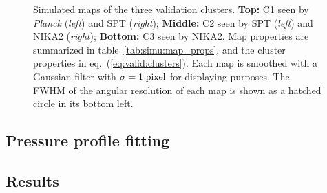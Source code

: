 \begin{figure}[t]
    \caption{%
        Simulated maps of the three validation clusters.
        \textbf{Top:} C1 seen by \textit{Planck} (\textit{left}) and SPT (\textit{right});
        \textbf{Middle:} C2 seen by SPT (\textit{left}) and NIKA2 (\textit{right});
        \textbf{Bottom:} C3 seen by NIKA2.
        Map properties are summarized in table~\ref{tab:simu:map_props}, and the cluster properties in eq.~(\ref{eq:valid:clusters}).
        Each map is smoothed with a Gaussian filter with $\sigma = 1 \; {\rm pixel}$ for displaying purposes.
        The FWHM of the angular resolution of each map is shown as a hatched circle in its bottom left.
    }
    \label{fig:valid:maps}
\end{figure}

\subsection{Pressure profile fitting}

\subsection{Results} \label{sec:simu:results}

